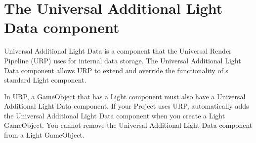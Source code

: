 \chapter{The Universal Additional Light Data component}
\hypertarget{md__hey_tea_9_2_library_2_package_cache_2com_8unity_8render-pipelines_8universal_0d14_80_88_2_dob5626691c231de1b206968405af858d0}{}\label{md__hey_tea_9_2_library_2_package_cache_2com_8unity_8render-pipelines_8universal_0d14_80_88_2_dob5626691c231de1b206968405af858d0}
\label{md__hey_tea_9_2_library_2_package_cache_2com_8unity_8render-pipelines_8universal_0d14_80_88_2_dob5626691c231de1b206968405af858d0_autotoc_md2523}%
%
 Universal Additional Light Data is a component that the Universal Render Pipeline (URP) uses for internal data storage. The Universal Additional Light Data component allows URP to extend and override the functionality of \textquotesingle{}s standard Light component.

In URP, a Game\+Object that has a Light component must also have a Universal Additional Light Data component. If your Project uses URP,  automatically adds the Universal Additional Light Data component when you create a Light Game\+Object. You cannot remove the Universal Additional Light Data component from a Light Game\+Object. 